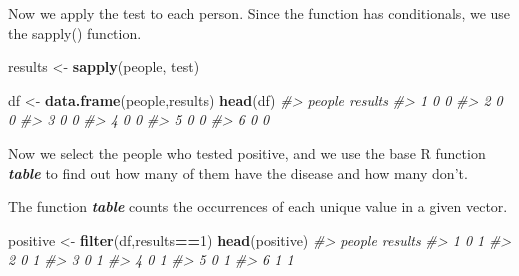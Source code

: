 \documentclass[
]{book}
\newenvironment{Shaded}{\begin{snugshade}}{\end{snugshade}}
\newcommand{\CommentTok}[1]{\textcolor[rgb]{0.56,0.35,0.01}{\textit{#1}}}
\newcommand{\DecValTok}[1]{\textcolor[rgb]{0.00,0.00,0.81}{#1}}
\newcommand{\FunctionTok}[1]{\textcolor[rgb]{0.13,0.29,0.53}{\textbf{#1}}}
\newcommand{\NormalTok}[1]{#1}
\newcommand{\OtherTok}[1]{\textcolor[rgb]{0.56,0.35,0.01}{#1}}
\newcommand{\SpecialCharTok}[1]{\textcolor[rgb]{0.81,0.36,0.00}{\textbf{#1}}}
\theoremstyle{definition}
\theoremstyle{definition}
\theoremstyle{definition}
\theoremstyle{definition}
\theoremstyle{remark}
\begin{document}
Now we apply the test to each person. Since the function has conditionals, we use the sapply() function.

\begin{Shaded}
\begin{Highlighting}[]
\NormalTok{results }\OtherTok{\textless{}{-}} \FunctionTok{sapply}\NormalTok{(people, test)}
\end{Highlighting}
\end{Shaded}

\begin{Shaded}
\begin{Highlighting}[]
\NormalTok{df }\OtherTok{\textless{}{-}} \FunctionTok{data.frame}\NormalTok{(people,results)}
\FunctionTok{head}\NormalTok{(df)}
\CommentTok{\#\textgreater{}   people results}
\CommentTok{\#\textgreater{} 1      0       0}
\CommentTok{\#\textgreater{} 2      0       0}
\CommentTok{\#\textgreater{} 3      0       0}
\CommentTok{\#\textgreater{} 4      0       0}
\CommentTok{\#\textgreater{} 5      0       0}
\CommentTok{\#\textgreater{} 6      0       0}
\end{Highlighting}
\end{Shaded}

Now we select the people who tested positive, and we use the base R function \textbf{\emph{table}} to find out how many of them have the disease and how many don't.

The function \textbf{\emph{table}} counts the occurrences of each unique value in a given vector.

\begin{Shaded}
\begin{Highlighting}[]
\NormalTok{positive }\OtherTok{\textless{}{-}} \FunctionTok{filter}\NormalTok{(df,results}\SpecialCharTok{==}\DecValTok{1}\NormalTok{)}
\FunctionTok{head}\NormalTok{(positive)}
\CommentTok{\#\textgreater{}   people results}
\CommentTok{\#\textgreater{} 1      0       1}
\CommentTok{\#\textgreater{} 2      0       1}
\CommentTok{\#\textgreater{} 3      0       1}
\CommentTok{\#\textgreater{} 4      0       1}
\CommentTok{\#\textgreater{} 5      0       1}
\CommentTok{\#\textgreater{} 6      1       1}
\end{Highlighting}
\end{Shaded}

\begin{Shaded}
\end{Shaded}
\end{document}
